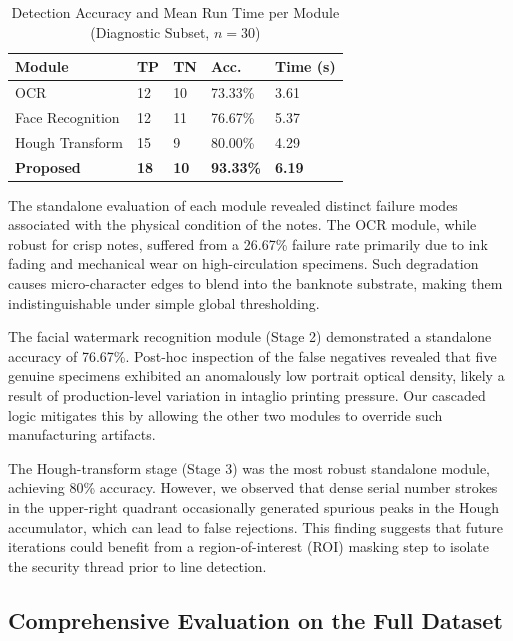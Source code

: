 \documentclass[journal]{IEEEtran}
\begin{document}
\begin{table}[!t]
\centering
\caption{Detection Accuracy and Mean Run Time per Module (Diagnostic Subset, $n = 30$)}
\label{tab:results}
\renewcommand{\arraystretch}{1.2}
\begin{tabular}{L{2.4cm} C{0.7cm} C{0.7cm} C{1.2cm} C{1.3cm}}
\toprule
\textbf{Module} & \textbf{TP} & \textbf{TN} & \textbf{Acc.} & \textbf{Time (s)} \\
\midrule
OCR & 12 & 10 & 73.33\% & 3.61 \\
Face Recognition & 12 & 11 & 76.67\% & 5.37 \\
Hough Transform & 15 & 9 & 80.00\% & 4.29 \\
\midrule
\textbf{Proposed} & \textbf{18} & \textbf{10} & \textbf{93.33\%} & \textbf{6.19} \\
\bottomrule
\end{tabular}
\end{table}

The standalone evaluation of each module revealed distinct failure modes associated with the physical condition of the notes. The OCR module, while robust for crisp notes, suffered from a 26.67\% failure rate primarily due to ink fading and mechanical wear on high-circulation specimens. Such degradation causes micro-character edges to blend into the banknote substrate, making them indistinguishable under simple global thresholding.

The facial watermark recognition module (Stage 2) demonstrated a standalone accuracy of 76.67\%. Post-hoc inspection of the false negatives revealed that five genuine specimens exhibited an anomalously low portrait optical density, likely a result of production-level variation in intaglio printing pressure. Our cascaded logic mitigates this by allowing the other two modules to override such manufacturing artifacts.

The Hough-transform stage (Stage 3) was the most robust standalone module, achieving 80\% accuracy. However, we observed that dense serial number strokes in the upper-right quadrant occasionally generated spurious peaks in the Hough accumulator, which can lead to false rejections. This finding suggests that future iterations could benefit from a region-of-interest (ROI) masking step to isolate the security thread prior to line detection.

\subsection{Comprehensive Evaluation on the Full Dataset}
\end{document}
